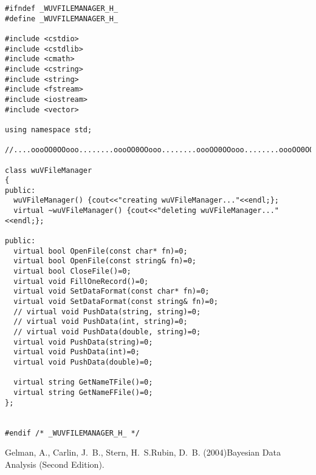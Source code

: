 \documentclass[11pt,a4paper,titlepage]{article}
\begin{document}
\begin{lstlisting}
#ifndef _WUVFILEMANAGER_H_
#define _WUVFILEMANAGER_H_

#include <cstdio>
#include <cstdlib>
#include <cmath>
#include <cstring>
#include <string>
#include <fstream>
#include <iostream>
#include <vector>

using namespace std;

//....oooOO0OOooo........oooOO0OOooo........oooOO0OOooo........oooOO0OOooo......

class wuVFileManager
{
public:
  wuVFileManager() {cout<<"creating wuVFileManager..."<<endl;};
  virtual ~wuVFileManager() {cout<<"deleting wuVFileManager..."<<endl;};

public:
  virtual bool OpenFile(const char* fn)=0;
  virtual bool OpenFile(const string& fn)=0;
  virtual bool CloseFile()=0;
  virtual void FillOneRecord()=0;
  virtual void SetDataFormat(const char* fn)=0;
  virtual void SetDataFormat(const string& fn)=0;
  // virtual void PushData(string, string)=0;
  // virtual void PushData(int, string)=0;
  // virtual void PushData(double, string)=0;
  virtual void PushData(string)=0;
  virtual void PushData(int)=0;
  virtual void PushData(double)=0;

  virtual string GetNameTFile()=0;
  virtual string GetNameFFile()=0;
};


#endif /* _WUVFILEMANAGER_H_ */
\end{lstlisting}


\begin{thebibliography}{}
 Gelman, A., Carlin, J.~B., Stern, H.~S.Rubin, D.~B. (2004)Bayesian Data Analysis (Second Edition).
\end{thebibliography}
\end{document}
